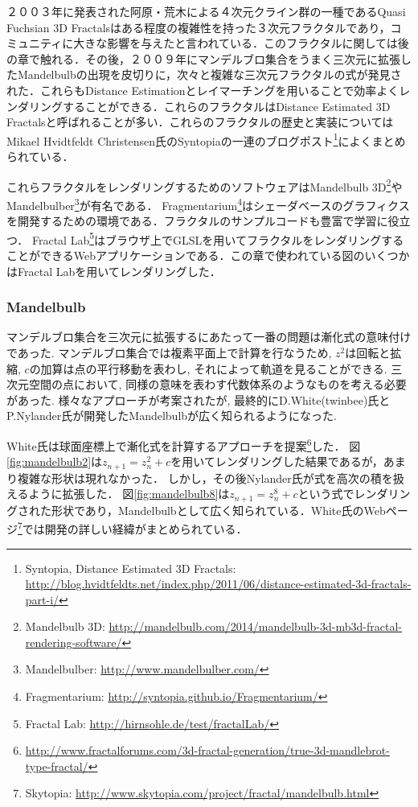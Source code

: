 ２００３年に発表された阿原・荒木\cite{sphairahedra}による４次元クライン群の一種であるQuasi Fuchsian 3D Fractalsはある程度の複雑性を持った３次元フラクタルであり，コミュニティに大きな影響を与えたと言われている．このフラクタルに関しては後の章で触れる．その後，２００９年にマンデルブロ集合をうまく三次元に拡張したMandelbulbの出現を皮切りに，次々と複雑な三次元フラクタルの式が発見された．これらもDistance Estimationとレイマーチングを用いることで効率よくレンダリングすることができる．これらのフラクタルはDistance Estimated 3D Fractalsと呼ばれることが多い．これらのフラクタルの歴史と実装についてはMikael Hvidtfeldt Christensen氏のSyntopiaの一連のブログポスト\footnote{Syntopia, Distance Estimated 3D Fractals: \url{http://blog.hvidtfeldts.net/index.php/2011/06/distance-estimated-3d-fractals-part-i/}}によくまとめられている．

これらフラクタルをレンダリングするためのソフトウェアはMandelbulb 3D\footnote{Mandelbulb 3D: \url{http://mandelbulb.com/2014/mandelbulb-3d-mb3d-fractal-rendering-software/}}やMandelbulber\footnote{Mandelbulber: \url{http://www.mandelbulber.com/}}が有名である．
Fragmentarium\footnote{Fragmentarium: \url{http://syntopia.github.io/Fragmentarium/}}はシェーダベースのグラフィクスを開発するための環境である．フラクタルのサンプルコードも豊富で学習に役立つ．
Fractal Lab\footnote{Fractal Lab: \url{http://hirnsohle.de/test/fractalLab/}}はブラウザ上でGLSLを用いてフラクタルをレンダリングすることができるWebアプリケーションである．この章で使われている図のいくつかはFractal Labを用いてレンダリングした．

\subsubsection{Mandelbulb}

マンデルブロ集合を三次元に拡張するにあたって一番の問題は漸化式の意味付けであった.
マンデルブロ集合では複素平面上で計算を行なうため, $z^2$は回転と拡縮, $c$の加算は点の平行移動を表わし, それによって軌道を見ることができる. 
三次元空間の点において, 同様の意味を表わす代数体系のようなものを考える必要があった. 
様々なアプローチが考案されたが, 最終的にD.White(twinbee)氏とP.Nylander氏が開発したMandelbulbが広く知られるようになった. 

White氏は球面座標上で漸化式を計算するアプローチを提案\footnote{\url{http://www.fractalforums.com/3d-fractal-generation/true-3d-mandlebrot-type-fractal/}}した．
図\ref{fig:mandelbulb2}は$z_{n+1} = z_n^2 + c$を用いてレンダリングした結果であるが，あまり複雑な形状は現れなかった．
しかし，その後Nylander氏が式を高次の積を扱えるように拡張した．
図\ref{fig:mandelbulb8}は$z_{n+1} = z_n^8 + c $という式でレンダリングされた形状であり，Mandelbulbとして広く知られている．White氏のWebページ\footnote{Skytopia: \url{http://www.skytopia.com/project/fractal/mandelbulb.html}}では開発の詳しい経緯がまとめられている．

